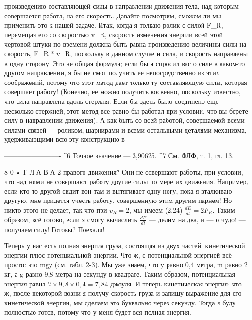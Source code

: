 \documentclass[10pt,oneside]{article}
\begin{document}
произведению составляющей силы в направлении движения тела, над которым совершается работа, на его скорость. Давайте посмотрим, сможем ли мы применить это к нашей задаче. Итак, когда я толкаю ролик с силой F\_R, перемещая его со скоростью v\_R, скорость изменения энергии всей этой чертовой штуки по времени должна быть равна произведению величины силы на скорость, F\_R * v\_R, поскольку в данном случае и сила, и скорость направлены в одну сторону. Это не общая формула; если бы я спросил вас о силе в каком-то другом направлении, я бы не смог получить ее непосредственно из этих соображений, потому что этот метод дает только ту составляющую силы, которая совершает работу! (Конечно, ее можно получить косвенно, поскольку известно, что сила направлена вдоль стержня. Если бы здесь было соединено еще несколько стержней, этот метод все равно бы работал при условии, что вы берете силу в направлении движения). А как быть со всей работой, совершаемой всеми силами связей --- роликом, шарнирами и всеми остальными деталями механизма, удерживающими всю эту конструкцию в\par

------------------------- \textasciicircum{}6 Точное значение --- 3,90625. \textasciicircum{}7 См. ФЛФ, т. 1, гл. 13.\par

8 0 • Г Л А В А  2 правого движения? Они не совершают работы, при условии, что над ними не совершают работу другие силы по мере их движения. Например, если кто-то другой сидит вон там и вытягивает одну ногу, пока я вталкиваю другую, мне придется учесть работу, совершенную этим другим парнем! Но никто этого не делает, так что при \(v_R = 2\), мы имеем (2.24) \(\frac{dE}{dt} = 2F_R\). Таким образом, всё готово, если я смогу вычислить \(\frac{dE}{dt}\) --- делим на два, и --- о чудо! --- получаем силу! Готовы? Поехали!\par

Теперь у нас есть полная энергия груза, состоящая из двух частей: кинетической энергии плюс потенциальной энергии. Что ж, с потенциальной энергией всё просто: это mgy (см. табл. 2-3). Мы уже знаем, что y равно 0,4 метра, m равно 2 кг, а g равно 9,8 метра на секунду в квадрате. Таким образом, потенциальная энергия равна \(2 \times 9,8 \times 0,4 = 7,84\) джоуля. И теперь кинетическая энергия: что ж, после некоторой возни я получу скорость груза и запишу выражение для его кинетической энергии; мы сделаем это буквально через секунду. Тогда я буду полностью готов, потому что у меня будет вся полная энергия.\par
\end{document}
